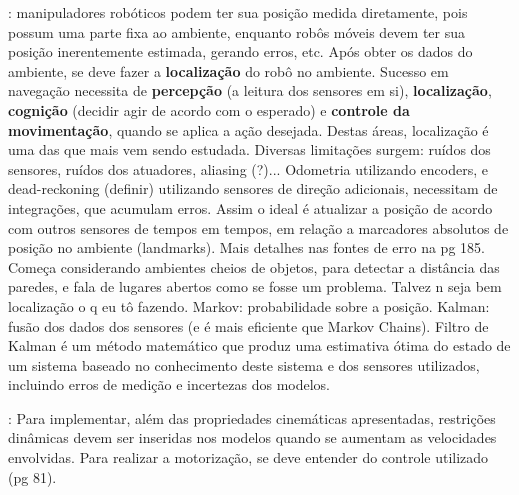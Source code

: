\cite{siegwart2011introduction}: manipuladores robóticos podem ter sua posição medida diretamente, pois possum uma parte fixa ao ambiente, enquanto robôs móveis devem ter sua posição inerentemente estimada, gerando erros, etc. Após obter os dados do ambiente, se deve fazer a \textbf{localização} do robô no ambiente. Sucesso em navegação necessita de \textbf{percepção} (a leitura dos sensores em si), \textbf{localização}, \textbf{cognição} (decidir agir de acordo com o esperado) e \textbf{controle da movimentação}, quando se aplica a ação desejada. Destas áreas, localização é uma das que mais vem sendo estudada. Diversas limitações surgem: ruídos dos sensores, ruídos dos atuadores, aliasing (?)... Odometria utilizando encoders, e dead-reckoning (definir) utilizando sensores de direção adicionais, necessitam de integrações, que acumulam erros. Assim o ideal é atualizar a posição de acordo com outros sensores de tempos em tempos, em relação a marcadores absolutos de posição no ambiente (landmarks). Mais detalhes nas fontes de erro na pg 185. Começa considerando ambientes cheios de objetos, para detectar a distância das paredes, e fala de lugares abertos como se fosse um problema. Talvez n seja bem localização o q eu tô fazendo. Markov: probabilidade sobre a posição. Kalman: fusão dos dados dos sensores (e é mais eficiente que Markov Chains). Filtro de Kalman é um método matemático que produz uma estimativa ótima do estado de um sistema baseado no conhecimento deste sistema e dos sensores utilizados, incluindo erros de medição e incertezas dos modelos.

\cite{siegwart2011introduction}: Para implementar, além das propriedades cinemáticas apresentadas, restrições dinâmicas devem ser inseridas nos modelos quando se aumentam as velocidades envolvidas. Para realizar a motorização, se deve entender do controle utilizado (pg 81).





